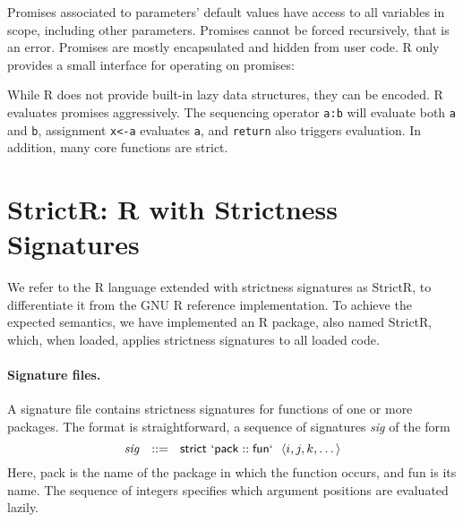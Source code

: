 \documentclass[review,nonacm,screen,acmsmall,anonymous=true]{acmart}
\newcommand{\code}[1]{\lstinline |#1|\xspace}
\newcommand{\strictr}{{\sf StrictR}\xspace}
\begin{document}
\noindent
Promises associated to parameters' default values have access to all variables
in scope, including other parameters. Promises cannot be forced recursively,
that is an error. Promises are mostly encapsulated and hidden from user code. R
only provides a small interface for operating on promises:

\noindent
While R does not provide built-in lazy data structures, they can be encoded. R
evaluates promises aggressively. The sequencing operator \code{a:b} will
evaluate both \code a and \code b, assignment \code{x<-a} evaluates \code a, and
\code{return} also triggers evaluation. In addition, many core functions are
strict.

\newpage %
\section{StrictR: R with Strictness Signatures}\label{sec:strictr}

We refer to the R language extended with strictness signatures as \strictr, to
differentiate it from the GNU R reference implementation. To achieve the
expected semantics, we have implemented an R package, also named \strictr,
which, when loaded, applies strictness signatures to all loaded code.

\paragraph{Signature files.}
A signature file contains strictness signatures for functions of one or more
packages. The format is straightforward, a sequence of signatures \emph{sig} of
the form
%
\[
\mathit{sig}~~::=~~\mathsf{strict}~\mathsf{`pack}::\mathsf{fun`}~~\langle i, j, k, \dots\rangle
\]
%
Here, {\sf pack} is the name of the package in which the function occurs, and {\sf
  fun} is its name. The sequence of integers specifies which argument positions
are evaluated lazily.
\end{document}

